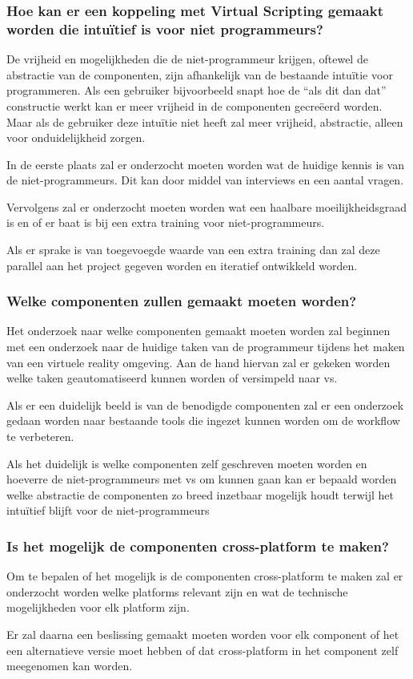 \subsubsection{Hoe kan er een koppeling met Virtual Scripting gemaakt worden die intuïtief is voor niet programmeurs?}

De vrijheid en mogelijkheden die de niet-programmeur krijgen, oftewel de abstractie van de componenten, zijn afhankelijk van de bestaande intuïtie voor programmeren. Als een gebruiker bijvoorbeeld snapt hoe de “als dit dan dat” constructie werkt kan er meer vrijheid in de componenten gecreëerd worden. Maar als de gebruiker deze intuïtie niet heeft zal meer vrijheid, abstractie, alleen voor onduidelijkheid zorgen.

In de eerste plaats zal er onderzocht moeten worden wat de huidige kennis is van de niet-programmeurs. Dit kan door middel van interviews en een aantal vragen.

Vervolgens zal er onderzocht moeten worden wat een haalbare moeilijkheidsgraad is en of er baat is bij een extra training voor niet-programmeurs.

Als er sprake is van toegevoegde waarde van een extra training dan zal deze parallel aan het project gegeven worden en iteratief ontwikkeld worden.

\subsubsection{Welke componenten zullen gemaakt moeten worden?}
Het onderzoek naar welke componenten gemaakt moeten worden zal beginnen met een onderzoek naar de huidige taken van de programmeur tijdens het maken van een virtuele reality omgeving. Aan de hand hiervan zal er gekeken worden welke taken geautomatiseerd kunnen worden of versimpeld naar \gls{vs}.

Als er een duidelijk beeld is van de benodigde componenten zal er een onderzoek gedaan worden naar bestaande tools die ingezet kunnen worden om de workflow te verbeteren.

Als het duidelijk is welke componenten zelf geschreven moeten worden en hoeverre de niet-programmeurs met \gls{vs} om kunnen gaan kan er bepaald worden welke abstractie de componenten zo breed inzetbaar mogelijk houdt terwijl het intuïtief blijft voor de niet-programmeurs

\subsubsection{Is het mogelijk de componenten cross-platform te maken?}
Om te bepalen of het mogelijk is de componenten cross-platform te maken zal er onderzocht worden welke platforms relevant zijn en wat de technische mogelijkheden voor elk platform zijn.

Er zal daarna een beslissing gemaakt moeten worden voor elk component of het een alternatieve versie moet hebben of dat cross-platform in het component zelf meegenomen kan worden.
